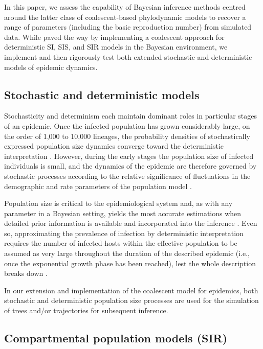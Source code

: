 \documentclass[12pt,titlepage]{article}
\begin{document}
In this paper, we assess the capability of Bayesian
inference methods centred around the latter class of coalescent-based
phylodynamic models to recover a range of parameters (including the
basic reproduction number) from simulated data.  
While \cite{DearloveandWilson} paved the way by implementing a coalescent approach for deterministic SI, SIS, and SIR models in the Bayesian environment, 
we implement and then rigorously test both extended stochastic and deterministic models of epidemic dynamics.

\subsection{Stochastic and deterministic models}

Stochasticity and determinism each maintain dominant roles in particular stages 
of an epidemic.  Once the infected population has grown considerably large, on the order 
of 1,000 to 10,000 lineages, the probability densities of stochastically expressed 
population size dynamics converge toward the deterministic interpretation \citep{Rouzine:2001}. However, 
during the early stages the population size of infected individuals is small, and the 
dynamics of the epidemic are therefore governed by stochastic processes according to the 
relative significance of fluctuations in the demographic and rate parameters of the 
population model \citep{Kuhnert:2014}.

Population size is critical to the epidemiological system and, as with any parameter in a 
Bayesian setting, yields the most accurate estimations when detailed prior information 
is available and incorporated into the inference \citep{Drummond:2006}.   Even so, 
approximating the prevalence of infection by deterministic interpretation requires the 
number of infected hosts within the effective population to be assumed as very large 
throughout the duration of the described epidemic (i.e., once the exponential growth phase 
has been reached), lest the whole description breaks down \citep{Rouzine:2001}.

In our extension and implementation of the coalescent model for epidemics, both stochastic and deterministic population size
processes are used for the simulation of trees and/or trajectories for subsequent inference.

\subsection{Compartmental population models (SIR)}
\end{document}
